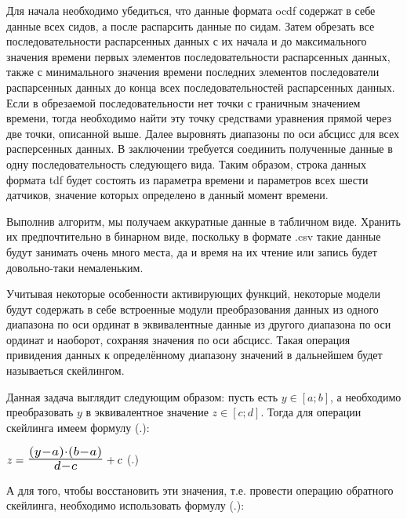 {  \par \redline Для начала необходимо убедиться, что данные формата ocdf содержат в себе данные всех сидов, а после распарсить данные по сидам. Затем обрезать все последовательности распарсенных данных с их начала и до максимального значения времени первых элементов последовательности распарсенных данных, также с минимального значения времени последних элементов последователи распарсенных данных до конца всех последовательностей распарсенных данных. Если в обрезаемой последовательности нет точки с граничным значением времени, тогда необходимо найти эту точку средствами уравнения прямой через две точки, описанной выше. Далее выровнять диапазоны по оси абсцисс для всех расперсенных данных. В заключении требуется соединить полученные данные в одну последовательность следующего вида. Таким образом, строка данных формата tdf будет состоять из параметра времени и параметров всех шести датчиков, значение которых определено в данный момент времени. 

  \par \redline Выполнив алгоритм, мы получаем аккуратные данные в табличном виде. Хранить их предпочтительно в бинарном виде, поскольку в формате .csv такие данные будут занимать очень много места, да и время на их чтение или запись будет довольно-таки немаленьким. 

  \par \redline Учитывая некоторые особенности активирующих функций, некоторые модели будут содержать в себе встроенные модули преобразования данных из одного диапазона по оси ординат в эквивалентные данные из другого диапазона по оси ординат и наоборот, сохраняя значения по оси абсцисс. Такая операция привидения данных к определённому диапазону значений в дальнейшем будет называеться скейлингом.

  \par \redline Данная задача выглядит следующим образом: пусть есть $y \in \left[a; b\right]$, а необходимо преобразовать $y$ в эквивалентное значение $z \in \left[c; d\right]$. Тогда для операции скейлинга имеем формулу (\thechaptercntr .\theformulacntr):

  \formulaspace \par \redline 
    $z = \scaleto{\frac{\left(y - a\right) \cdot \left(b - a\right)}{d - c}}{22pt} + c$
    \hfill (\thechaptercntr .\theformulacntr) \redline
  \formulaspace \addtocounter{formulacntr}{1}

  \par \redline А для того, чтобы восстановить эти значения, т.е. провести операцию обратного скейлинга, необходимо использовать формулу (\thechaptercntr .\theformulacntr): 

}
